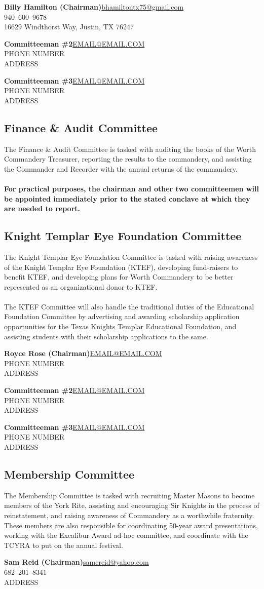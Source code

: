 \documentclass[letterpaper]{article}
\newcommand{\cman}[4]{\textbf{#1}\hfill{}\url{#2}\\\hphantom{0em}\hfill{}#3\\\hphantom{0em}\hfill{}#4}
\newcommand{\comm}[3]{\subsection*{#1 Committee\textsuperscript{#2}}The #1 Committee is tasked with #3\bigskip}
\newcommand{\mand}{\CrossMaltese}
\begin{document}
		\cman{Billy Hamilton (Chairman)}{bhamiltontx75@gmail.com}{940--600--9678}{16629 Windthorst Way, Justin, TX 76247}
		
		\cman{Committeeman \#2}{EMAIL@EMAIL.COM}{PHONE NUMBER}{ADDRESS}
		
		\cman{Committeeman \#3}{EMAIL@EMAIL.COM}{PHONE NUMBER}{ADDRESS}
	
	\pagebreak
	
	\comm{Finance \& Audit}{\mand}{auditing the books of the Worth Commandery Treasurer, reporting the results to the commandery, and assisting the Commander and Recorder with the annual returns of the commandery.\\\\\textbf{For practical purposes, the chairman and other two committeemen will be appointed immediately prior to the stated conclave at which they are needed to report.}}
	
	\pagebreak
	
	\comm{Knight Templar Eye Foundation}{\mand}{raising awareness of the Knight Templar Eye Foundation (KTEF), developing fund-raisers to benefit KTEF, and developing plans for Worth Commandery to be better represented as an organizational donor to KTEF.\\\\The KTEF Committee will also handle the traditional duties of the Educational Foundation Committee by advertising and awarding scholarship application opportunities for the Texas Knights Templar Educational Foundation, and assisting students with their scholarship applications to the same.}
	
		\cman{Royce Rose (Chairman)}{EMAIL@EMAIL.COM}{PHONE NUMBER}{ADDRESS}
		
		\cman{Committeeman \#2}{EMAIL@EMAIL.COM}{PHONE NUMBER}{ADDRESS}
		
		\cman{Committeeman \#3}{EMAIL@EMAIL.COM}{PHONE NUMBER}{ADDRESS}
	
	\pagebreak
		
	\comm{Membership}{\mand}{recruiting Master Masons to become members of the York Rite, assisting and encouraging Sir Knights in the process of reinstatement, and raising awareness of Commandery as a worthwhile fraternity. These members are also responsible for coordinating 50-year award presentations, working with the Excalibur Award ad-hoc committee, and coordinate with the TCYRA to put on the annual festival.}
	
		\cman{Sam Reid (Chairman)}{samcreid@yahoo.com}{682--201--8341}{ADDRESS}
		
\end{document}
